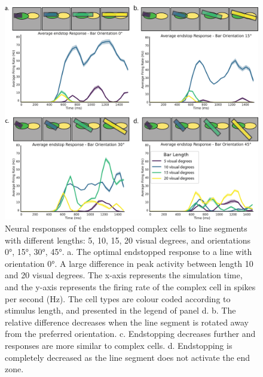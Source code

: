 \documentclass[12pt]{article}
\begin{document}
\begin{figure}[H]
    \centering
    \includegraphics[width=1.0 \textwidth]{./adjusted_figures/LIF_endstopping_length_orientation.png}
    \caption{Neural responses of the endstopped complex cells to line segments with different lengths: 5, 10, 15, 20 visual degrees, and orientations 0°, 15°, 30°, 45°. a. The optimal endstopped response to a line with orientation 0°. A large difference in peak activity between length 10 and 20 visual degrees. The x-axis represents the simulation time, and the y-axis represents the firing rate of the complex cell in spikes per second (Hz). The cell types are colour coded according to stimulus length, and presented in the legend of panel d. b. The relative difference decreases when the line segment is rotated away from the preferred orientation. c. Endstopping decreases further and responses are more similar to complex cells. d. Endstopping is completely decreased as the line segment does not activate the end zone.}
    \label{fig:endstopping}
\end{figure}
\end{document}
